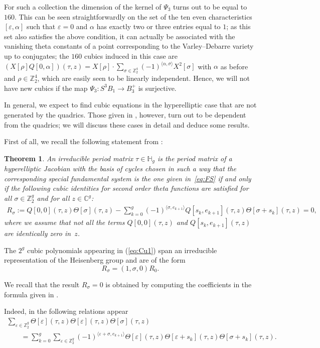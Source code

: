 \documentclass[pdftex]{sigma}
\numberwithin{equation}{section}
\newtheorem{Theorem}{Theorem}[section]
\newcommand{\ep}{\varepsilon}
\newcommand{\CC}{{\mathbb{C}}}
\newcommand{\HH}{{\mathbb{H}}}
\newcommand{\ZZ}{{\mathbb{Z}}}
\def\ZZ{{\mathbb Z}}
\def\s{\sigma}
\def\r{\rho}
\def\T{\Theta}
\begin{document}
For such a collection the dimension of the kernel of $\Psi_3$ turns out to be equal to $160$. This can be seen straightforwardly on the set of the ten even characteristics $[\ep, \alpha]$ such that $\ep = 0$ and $\alpha$ has exactly two or three entries equal to $1$; as this set also satisfies the above condition, it can actually be associated with the vanishing theta constants of a point corresponding to the Varley--Debarre variety up to conjugates; the $160$ cubics induced in this case are $(X[\r] Q[0, \alpha])(\tau,z)= X[\r] \cdot \sum\limits_{\s \in \ZZ_2^{4}}(-1)^{\langle \alpha, \s\rangle} X^2[\s]$ with $\alpha$ as before and $\r \in \ZZ_2^{4}$, which are easily seen to be linearly independent. Hence, we will not have new cubics if the map $ \Psi_3\colon S^3B_1\to B_3^+$ is surjective.

In general, we expect to find cubic equations in the hyperelliptic case that are not generated by the quadrics. Those given in \cite{Gr}, however, turn out to be dependent from the quadrics; we will discuss these cases in detail and deduce some results.

First of all, we recall the following statement from \cite{Gr}:

\begin{Theorem}\label{th.Gr} An irreducible period matrix $\tau\in \HH_g$ is the period matrix
of a hyperelliptic Jacobian with the basis of cycles chosen in such a way that the corresponding special fundamental system is the one given in~\eqref{eq:FS} if and only if the following cubic identities for second order theta functions are satisfied for all $\s\in \ZZ_2^g$ and for all $z\in \CC^g$:
 \begin{gather}\label{eq:Cu1}
 R_{\s}:= Q[0,0](\tau, z)\T[\s](\tau,z)- \sum_{k=0}^g (-1)^{\langle \s, e_{k+1}\rangle}
Q[s_k, e_{k+1}](\tau, z)\T[\s+s_k](\tau,z)=0,
\end{gather}
where we assume that not all the terms $ Q[0,0](\tau, z)$ and $Q[s_k, e_{k+1}](\tau, z)$ are identically zero in~$z$.
\end{Theorem}
\begin{Remark} The $2^g$ cubic polynomials appearing in (\ref{eq:Cu1}) span an irreducible representation of the Heisenberg group and are of the form
\[R_{\s}=(1,\s,0)R_0.
\]
\end{Remark}

We recall that the result $R_{\s}=0$ is obtained by computing the coefficients in the
formula given in \cite{BK2}.

Indeed, in \cite{Gr} the following relations appear
\begin{gather}
 \sum_{\ep\in\ZZ_2^g} \T[\ep](\tau,z)\T[\ep](\tau,z)\T[\s](\tau,z)\nonumber\\
\qquad {}= \sum_{k=0}^g \sum_{\ep\in\ZZ_2^g} (-1)^{\langle \ep+\s, e_{k+1}\rangle}\T[\ep](\tau,z)\T[\ep+ s_k](\tau,z)\T[\s+s_k](\tau,z). \label{eq:Cu}
\end{gather}
\end{document}
